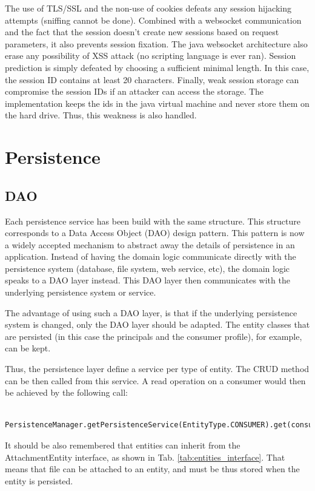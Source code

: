 The use of TLS/SSL and the non-use of cookies defeats any session hijacking attempts (sniffing cannot be done). Combined with a websocket communication and the fact that the session doesn't create new sessions based on request parameters, it also prevents session fixation. The java websocket architecture also erase any possibility of XSS attack (no scripting language is ever ran).
Session prediction is simply defeated by choosing a sufficient minimal length. In this case, the session ID contains at least 20 characters. Finally, weak session storage can compromise the session IDs if an attacker can access the storage. The implementation keeps the ids in the java virtual machine and never store them on the hard drive. Thus, this weakness is also handled.

\section{Persistence}

\subsection{DAO}
Each persistence service has been build with the same structure. This structure corresponds to a Data Access Object (DAO) design pattern. This pattern is now a widely accepted mechanism to abstract away the details of persistence in an application. Instead of having the domain logic communicate directly with the persistence system (database, file system, web service, etc), the domain logic speaks to a DAO layer instead. This DAO layer then communicates with the underlying persistence system or service.

The advantage of using such a DAO layer, is that if the underlying persistence system is changed, only the DAO layer should be adapted. The entity classes that are persisted (in this case the principals and the consumer profile), for example, can be kept. 

Thus, the persistence layer define a service per type of entity. The CRUD method can be then called from this service. A read operation on a consumer would then be achieved by the following call:

\lstset{language=Java}
\begin{lstlisting}
	PersistenceManager.getPersistenceService(EntityType.CONSUMER).get(consumerID)
\end{lstlisting}

It should be also remembered that entities can inherit from the AttachmentEntity interface, as shown in Tab. \ref{tab:entities_interface}. That means that file can be attached to an entity, and must be thus stored when the entity is persisted. 

